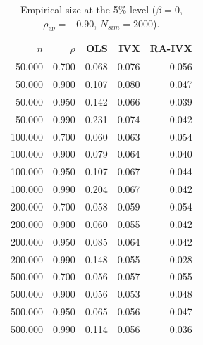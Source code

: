\begin{table}[ht]
\centering
\caption{Empirical size at the 5\% level ($\beta=0$, $\rho_{e\nu}=-0.90$, $N_{sim}=2000$).} 
\label{tab:mc_size}
\begin{tabular}{rrrrr}
  \hline
$n$ & $\rho$ & OLS & IVX & RA-IVX \\ 
  \hline
50.000 & 0.700 & 0.068 & 0.076 & 0.056 \\ 
  50.000 & 0.900 & 0.107 & 0.080 & 0.047 \\ 
  50.000 & 0.950 & 0.142 & 0.066 & 0.039 \\ 
  50.000 & 0.990 & 0.231 & 0.074 & 0.042 \\ 
  100.000 & 0.700 & 0.060 & 0.063 & 0.054 \\ 
  100.000 & 0.900 & 0.079 & 0.064 & 0.040 \\ 
  100.000 & 0.950 & 0.107 & 0.067 & 0.044 \\ 
  100.000 & 0.990 & 0.204 & 0.067 & 0.042 \\ 
  200.000 & 0.700 & 0.058 & 0.059 & 0.054 \\ 
  200.000 & 0.900 & 0.060 & 0.055 & 0.042 \\ 
  200.000 & 0.950 & 0.085 & 0.064 & 0.042 \\ 
  200.000 & 0.990 & 0.148 & 0.055 & 0.028 \\ 
  500.000 & 0.700 & 0.056 & 0.057 & 0.055 \\ 
  500.000 & 0.900 & 0.056 & 0.053 & 0.048 \\ 
  500.000 & 0.950 & 0.065 & 0.056 & 0.047 \\ 
  500.000 & 0.990 & 0.114 & 0.056 & 0.036 \\ 
   \hline
\end{tabular}
\end{table}
